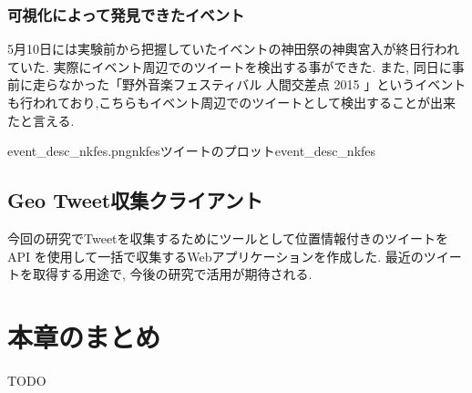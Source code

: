 \subsubsection{可視化によって発見できたイベント}
5月10日には実験前から把握していたイベントの神田祭の神輿宮入が終日行われていた\cite{webpage_kanda}.
実際にイベント周辺でのツイートを検出する事ができた.
また, 同日に事前に走らなかった「野外音楽フェスティバル 人間交差点 2015 \cite{webpage_nkfes}」というイベントも行われており,こちらもイベント周辺でのツイートとして検出することが出来たと言える.

{event_desc_nkfes.png}{nkfesツイートのプロット}{event_desc_nkfes}

\subsection{Geo Tweet収集クライアント}
今回の研究でTweetを収集するためにツールとして位置情報付きのツイートを API を使用して一括で収集するWebアプリケーションを作成した.
最近のツイートを取得する用途で, 今後の研究で活用が期待される.


\newpage

\section{本章のまとめ}
TODO




\newpage
